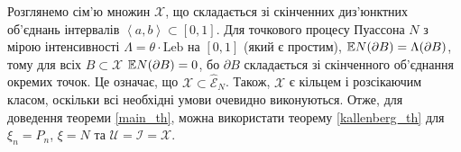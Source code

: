 Розглянемо сім'ю множин $\mathcal{X}$, що складається зі
скінченних диз'юнктних об'єд\-нань інтервалів $\left<a,b\right> \subset [0, 1]$.
Для точкового процесу Пуассона $N$
з мірою інтенсивності $\Lambda = \theta \cdot \mathrm{Leb}$ на $[0, 1]$ 
(який є простим),
$\mathbb{E} N(\partial B) = \Lambda (\partial B)$, тому 
для всіх $B \subset \mathcal{X}$ $\mathbb{E} N(\partial B) = 0$, бо
$\partial B$ складається зі скінченного об'єднання окремих точок.
Це означає, що $\mathcal{X} \subset \hat{\mathcal{E}}_N $.
Також, $\mathcal{X}$ є кільцем і розсікаючим класом, оскільки всі необхідні
умови очевидно виконуються.
Отже, для доведення теореми \ref{main_th}, можна використати теорему
\ref{kallenberg_th}
для $\xi_n = P_n$, $\xi = N$ та
$\mathcal{U} = \mathcal{I} = \mathcal{X}$.


